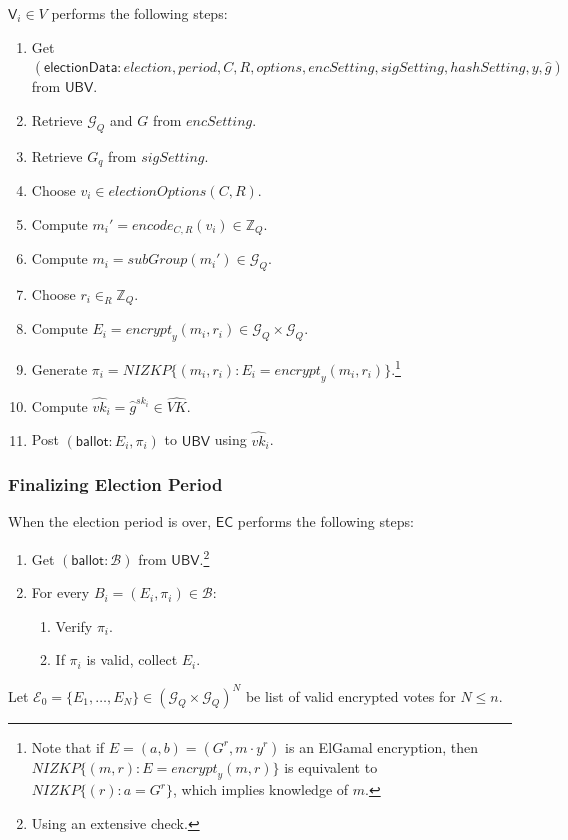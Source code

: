 \documentclass[bibtotoc,halfparskip,oneside]{scrreprt}
\newcommand{\descrElection}{\mathit{election}\xspace}
\newcommand{\descrOptions}{\mathit{options}\xspace}
\newcommand{\period}{\mathit{period}\xspace}
\newcommand{\sk}[1]{\mathit{sk}_{#1}\xspace}
\newcommand{\vkhat}[1]{\hat{\mathit{vk}}_{#1}\xspace}
\newcommand{\EC}{\ensuremath{\mathsf{EC}}\xspace}
\newcommand{\UBV}{\ensuremath{\mathsf{UBV}}\xspace}
\newcommand{\Voter}[1]{\ensuremath{\mathsf{V}_{#1}}\xspace}
\begin{document}
$\Voter{i}\in V$ performs the following steps:
\begin{enumerate}
	\item Get $(\mathsf{electionData}:\descrElection, \period, C, R, \descrOptions, \mathit{encSetting},\mathit{sigSetting},\mathit{hashSetting},y, \hat{g})$ from \UBV.
	\item Retrieve $\mathcal{G}_Q$ and $G$ from $\mathit{encSetting}$.
	\item Retrieve $G_q$ from $\mathit{sigSetting}$.
	\item Choose $v_i\in\mathit{electionOptions}(C,R)$.
	\item Compute $m_i'=\mathit{encode}_{C,R}(v_i) \in \mathbb{Z}_Q$.
	\item Compute $m_i=\mathit{subGroup}(m_i') \in \mathcal{G}_Q$.
	\item Choose $r_i\in_R\mathbb{Z}_Q$.
	\item Compute $E_i=\mathit{encrypt}_y(m_i,r_i)\in\mathcal{G}_Q\times\mathcal{G}_Q$.
	\item Generate $\pi_{i}=\mathit{NIZKP}\{(m_i,r_i):E_i=\mathit{encrypt}_y(m_i,r_i)\}$.\footnote{Note that if $E=(a,b)=(G^{r},m\cdot y^{r})$ is an ElGamal encryption, then $\mathit{NIZKP}\{(m,r):E=\mathit{encrypt}_y(m,r)\}$ is equivalent to $\mathit{NIZKP}\{(r):a=G^{r}\}$, which implies knowledge of $m$.}
	\item Compute $\vkhat{i}=\hat{g}^{\sk{i}}\in\hat{\mathit{VK}}$.
	\item Post $(\mathsf{ballot}:E_i,\pi_{i})$ to \UBV using $\vkhat{i}$.
\end{enumerate}

\subsubsection{Finalizing Election Period}

When the election period is over, \EC performs the following steps:
\begin{enumerate}
	\item Get $(\mathsf{ballot}:\mathcal{B})$ from \UBV.\footnote{Using an extensive check.}
	\item For every $B_i=(E_i,\pi_{i})\in\mathcal{B}$:
		\begin{enumerate}
			\item Verify $\pi_{i}$.
			\item If $\pi_{i}$ is valid, collect $E_{i}$.
		\end{enumerate}
\end{enumerate}
Let $\mathcal{E}_0=\{E_1,\ldots,E_N\}\in(\mathcal{G}_Q\times\mathcal{G}_Q)^N$ be list of valid encrypted votes for $N\leq n$.
\end{document}
